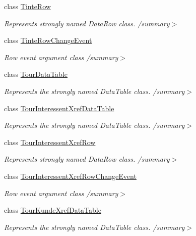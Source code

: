 \begin{DoxyCompactItemize}
class \hyperlink{class_products_1_1_data_1_1ds_sage_1_1_tinte_row}{Tinte\+Row}
\begin{DoxyCompactList}\small\item\em Represents strongly named Data\+Row class. /summary$>$ \end{DoxyCompactList}\item 
class \hyperlink{class_products_1_1_data_1_1ds_sage_1_1_tinte_row_change_event}{Tinte\+Row\+Change\+Event}
\begin{DoxyCompactList}\small\item\em Row event argument class /summary$>$ \end{DoxyCompactList}\item 
class \hyperlink{class_products_1_1_data_1_1ds_sage_1_1_tour_data_table}{Tour\+Data\+Table}
\begin{DoxyCompactList}\small\item\em Represents the strongly named Data\+Table class. /summary$>$ \end{DoxyCompactList}\item 
class \hyperlink{class_products_1_1_data_1_1ds_sage_1_1_tour_interessent_xref_data_table}{Tour\+Interessent\+Xref\+Data\+Table}
\begin{DoxyCompactList}\small\item\em Represents the strongly named Data\+Table class. /summary$>$ \end{DoxyCompactList}\item 
class \hyperlink{class_products_1_1_data_1_1ds_sage_1_1_tour_interessent_xref_row}{Tour\+Interessent\+Xref\+Row}
\begin{DoxyCompactList}\small\item\em Represents strongly named Data\+Row class. /summary$>$ \end{DoxyCompactList}\item 
class \hyperlink{class_products_1_1_data_1_1ds_sage_1_1_tour_interessent_xref_row_change_event}{Tour\+Interessent\+Xref\+Row\+Change\+Event}
\begin{DoxyCompactList}\small\item\em Row event argument class /summary$>$ \end{DoxyCompactList}\item 
class \hyperlink{class_products_1_1_data_1_1ds_sage_1_1_tour_kunde_xref_data_table}{Tour\+Kunde\+Xref\+Data\+Table}
\begin{DoxyCompactList}\small\item\em Represents the strongly named Data\+Table class. /summary$>$ \end{DoxyCompactList}\item 

\end{DoxyCompactItemize}
